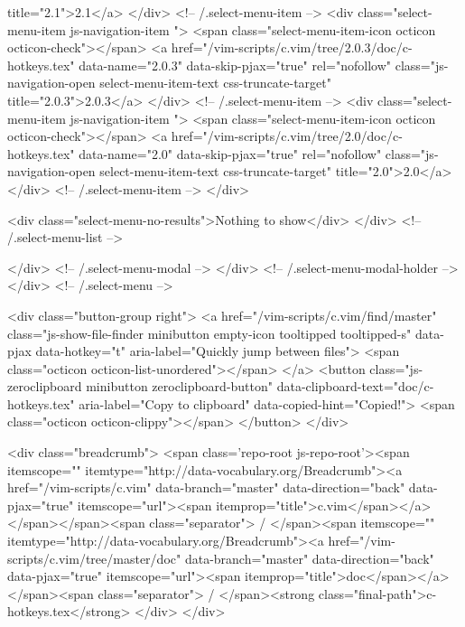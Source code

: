                  title="2.1">2.1</a>
            </div> <!-- /.select-menu-item -->
            <div class="select-menu-item js-navigation-item ">
              <span class="select-menu-item-icon octicon octicon-check"></span>
              <a href="/vim-scripts/c.vim/tree/2.0.3/doc/c-hotkeys.tex"
                 data-name="2.0.3"
                 data-skip-pjax="true"
                 rel="nofollow"
                 class="js-navigation-open select-menu-item-text css-truncate-target"
                 title="2.0.3">2.0.3</a>
            </div> <!-- /.select-menu-item -->
            <div class="select-menu-item js-navigation-item ">
              <span class="select-menu-item-icon octicon octicon-check"></span>
              <a href="/vim-scripts/c.vim/tree/2.0/doc/c-hotkeys.tex"
                 data-name="2.0"
                 data-skip-pjax="true"
                 rel="nofollow"
                 class="js-navigation-open select-menu-item-text css-truncate-target"
                 title="2.0">2.0</a>
            </div> <!-- /.select-menu-item -->
        </div>

        <div class="select-menu-no-results">Nothing to show</div>
      </div> <!-- /.select-menu-list -->

    </div> <!-- /.select-menu-modal -->
  </div> <!-- /.select-menu-modal-holder -->
</div> <!-- /.select-menu -->

  <div class="button-group right">
    <a href="/vim-scripts/c.vim/find/master"
          class="js-show-file-finder minibutton empty-icon tooltipped tooltipped-s"
          data-pjax
          data-hotkey="t"
          aria-label="Quickly jump between files">
      <span class="octicon octicon-list-unordered"></span>
    </a>
    <button class="js-zeroclipboard minibutton zeroclipboard-button"
          data-clipboard-text="doc/c-hotkeys.tex"
          aria-label="Copy to clipboard"
          data-copied-hint="Copied!">
      <span class="octicon octicon-clippy"></span>
    </button>
  </div>

  <div class="breadcrumb">
    <span class='repo-root js-repo-root'><span itemscope="" itemtype="http://data-vocabulary.org/Breadcrumb"><a href="/vim-scripts/c.vim" data-branch="master" data-direction="back" data-pjax="true" itemscope="url"><span itemprop="title">c.vim</span></a></span></span><span class="separator"> / </span><span itemscope="" itemtype="http://data-vocabulary.org/Breadcrumb"><a href="/vim-scripts/c.vim/tree/master/doc" data-branch="master" data-direction="back" data-pjax="true" itemscope="url"><span itemprop="title">doc</span></a></span><span class="separator"> / </span><strong class="final-path">c-hotkeys.tex</strong>
  </div>
</div>


